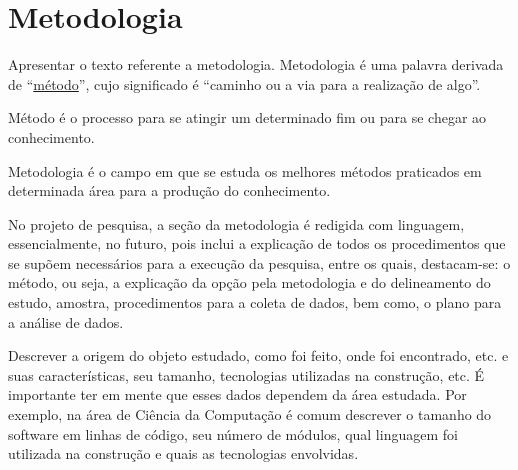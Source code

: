 \section{Metodologia}

Apresentar o texto referente a metodologia. Metodologia é uma palavra derivada de “\underline{método}”, cujo significado é “caminho ou a via para a realização de algo”.

Método é o processo para se atingir um determinado fim ou para se chegar ao conhecimento.

Metodologia é o campo em que se estuda os melhores métodos praticados em determinada área para a produção do conhecimento.

No projeto de pesquisa, a seção da metodologia é redigida com linguagem, essencialmente, no futuro, pois inclui a explicação de todos os procedimentos que se supõem necessários para a execução da pesquisa, entre os quais, destacam-se: o método, ou seja, a explicação da opção pela metodologia e do delineamento do estudo, amostra, procedimentos para a coleta de dados, bem como, o plano para a análise de dados.

Descrever a origem do objeto estudado, como foi feito, onde foi encontrado, etc. e
suas características, seu tamanho, tecnologias utilizadas na construção, etc. É importante ter em mente que esses dados dependem da área estudada. Por exemplo, na área de Ciência da Computação é comum descrever o tamanho do software em linhas de código, seu número de módulos, qual linguagem foi utilizada na construção e quais as tecnologias envolvidas.